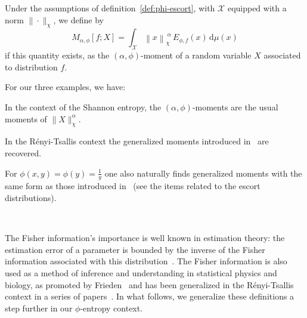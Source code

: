 \documentclass[entropy,article,submit,moreauthors,pdftex]{Definitions/mdpi}
\newcounter{GaussExample}%
\newcounter{qGaussExample}%
\newcounter{arcsineExample}%
\def\dmu{\mathrm{d}\mu}%
\def\X{\mathcal{X}}%
\begin{document}
\begin{Definition}
\label{def:phi-moment}
%
  Under the  assumptions of  definition~\ref{def:phi-escort}, with  $\X$ equipped
  with a norm $\| \cdot \|_\chi$, we define by
  \begin{equation}\label{eq:phi-moment}
  M_{\alpha,\phi}[f;X] = \int_\X \left\| x \right\|_\chi^{\: \alpha} \,
  E_{\phi,f}(x) \, \dmu(x)
  \end{equation}
  if this  quantity exists, as  the $(\alpha,\phi)$-moment of a  random variable
  $X$ associated to distribution $f$.
\end{Definition}
%
For our three examples, we have:
%
\begin{Example}
  In the  context of  the Shannon entropy,  the $(\alpha,\phi)$-moments  are the
  usual moments of $\|X\|_\chi^\alpha$.
\end{Example}
%
\begin{Example}
  In   the   R\'enyi-Tsallis   context  the   generalized   moments   introduced
  in~\cite{TsaMen98, MarNic00} are recovered.
\end{Example}
%
\begin{Example}
  For $\phi(x,y) =  \phi(y) = \frac{1}{y}$ one also  naturally finds generalized
  moments with  the same form  as those introduced  in~\cite{TsaMen98, MarNic00}
  (see the items related to the escort distributions).
\end{Example}

\

The  Fisher information's  importance is  well known  in estimation  theory: the
estimation  error  of a  parameter  is  bounded by  the  inverse  of the  Fisher
information associated with this distribution~\cite{Kay93, CovTho06}. The Fisher
information  is  also  used  as  a method  of  inference  and  understanding  in
statistical physics  and biology,  as promoted  by Frieden~\cite{Fri04}  and has
been   generalized   in   the   R\'enyi-Tsallis   context   in   a   series   of
papers~\cite{Ham78,   ChiPen00,   CasChi02,   LutYan05,   LutLv12,   Ber12:06_1,
  Ber12:06_2, Ber13}.  In  what follows, we generalize these  definitions a step
further in our $\phi$-entropy context.
\end{document}
